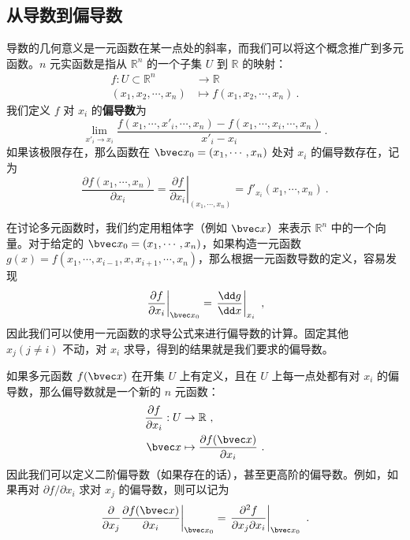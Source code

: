 
\subsection{从导数到偏导数}
导数的几何意义是一元函数在某一点处的斜率，而我们可以将这个概念推广到多元函数。$n$ 元实函数是指从 $\mathbb{R} ^n$ 的一个子集 $U$ 到 $\mathbb{R}$ 的映射：
\begin{equation}
\begin{aligned}
f:U\subset \mathbb{R} ^n&\rightarrow \mathbb{R}\\
(x_1,x_2,\cdots,x_n)&\mapsto f(x_1,x_2,\cdots,x_n)~.
\end{aligned}
\end{equation}
我们定义 $f$ 对 $x_i$ 的\textbf{偏导数}为
\begin{equation}
\lim\limits_{x'_i\rightarrow x_{i}}\frac{f(x_1,\cdots,x'_i,\cdots,x_n)-f(x_1,\cdots,x_i,\cdots,x_n)}{x'_i-x_i}~.
\end{equation}
如果该极限存在，那么函数在 $\bvec x_0=(x_1,\cdots,x_n)$ 处对 $x_i$ 的偏导数存在，记为
\begin{equation}
\frac{\partial f(x_1,\cdots,x_n)}{\partial x_i}=\left.\frac{\partial f}{\partial x_i}\right|_{(x_1,\cdots,x_n)}=f'_{x_i}(x_1,\cdots,x_n)~.
\end{equation}

在讨论多元函数时，我们约定用粗体字（例如 $\bvec x$）来表示 $\mathbb{R}^n$ 中的一个向量。对于给定的 $\bvec x_0=(x_1,\cdots,x_n)$，如果构造一元函数 $g(x)=f(x_1,\cdots,x_{i-1},x,x_{i+1},\cdots,x_n)$，那么根据一元函数导数的定义，容易发现
\begin{equation}
\left.\frac{\partial f}{\partial x_i}\right|_{\bvec x_0}=\left.\frac{\dd g}{\dd x}\right|_{x_i}~,
\end{equation}
因此我们可以使用一元函数的求导公式来进行偏导数的计算。固定其他 $x_j(j\neq i)$ 不动，对 $x_i$ 求导，得到的结果就是我们要求的偏导数。

如果多元函数 $f(\bvec x)$ 在开集 $U$ 上有定义，且在 $U$ 上每一点处都有对 $x_i$ 的偏导数，那么偏导数就是一个新的 $n$ 元函数：
\begin{equation}
\begin{aligned}
\frac{\partial f}{\partial x_i}: U&\rightarrow \mathbb{R}~,\\
\bvec x&\mapsto \frac{\partial f(\bvec x)}{\partial x_i}~.
\end{aligned}
\end{equation}
因此我们可以定义二阶偏导数（如果存在的话），甚至更高阶的偏导数。例如，如果再对 $\partial f/\partial x_i$ 求对 $x_j$ 的偏导数，则可以记为
\begin{equation}
\left.\frac{\partial}{\partial x_j} \frac{\partial f(\bvec x)}{\partial x_i}\right|_{\bvec x_0}=\left.\frac{\partial^2 f}{\partial x_j\partial x_i }\right|_{\bvec x_0}~.
\end{equation}

